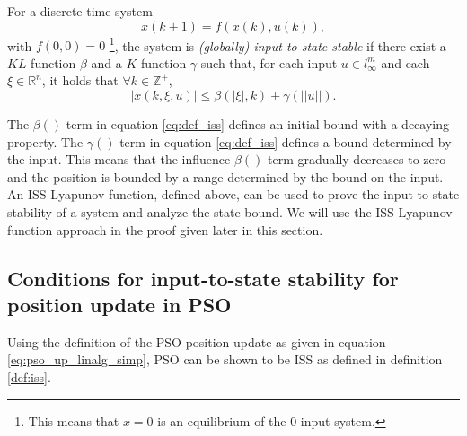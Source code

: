 \begin{mydef}\cite{Jiang2001857}
\label{def:iss}
For a discrete-time system
\begin{equation}
\label{eq:dis_nonlinear}
x(k+1) = f( x(k) , u(k) ),
\end{equation}
with $ f(0,0) = 0 $
\footnote{This means that $ x = 0 $ is an equilibrium of the 0-input system.}, the system is \emph{(globally) input-to-state stable} if there exist a $ KL $-function $ \beta  $ and a $ K $-function $ \gamma $ such that, for each input $ u \in l^{m}_{\infty} $ and each $ \xi \in \mathbb{R}^{n} $, it holds that $  \forall k \in \mathbb{Z}^{+} $,
\begin{equation}
\label{eq:def_iss}
| x(k, \xi, u) | \leq \beta (| \xi |, k) + \gamma (|| u ||).
\end{equation}
\end{mydef}

The $ \beta () $ term in equation \eqref{eq:def_iss} defines an initial bound with a decaying property.
The $ \gamma () $ term in equation \eqref{eq:def_iss} defines a bound determined by the input.
This means that the influence $ \beta () $ term gradually decreases to zero and the position is bounded by a range determined by the bound on the input.
An ISS-Lyapunov function, defined above, can be used to prove the input-to-state stability of a system and analyze the state bound\cite{Jiang2001857}.
We will use the ISS-Lyapunov-function approach in the proof given later in this section.

\subsection{Conditions for input-to-state stability for position update in PSO}

Using the definition of the PSO position update as given in equation \eqref{eq:pso_up_linalg_simp}, PSO can be shown to be ISS as defined in definition \ref{def:iss}.

